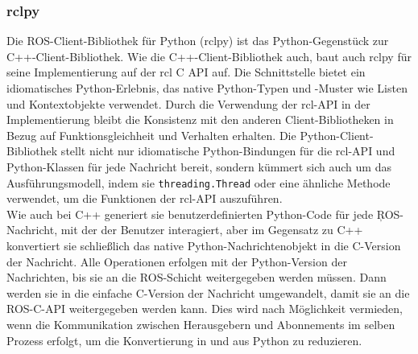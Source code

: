 \subsubsection{rclpy}\label{subsubsec:ROS2rclpy}
Die \ac{ROS}-Client-Bibliothek für Python (rclpy) ist das Python-Gegenstück zur C++-Client-Bibliothek. Wie die C++-Client-Bibliothek auch, baut auch rclpy für seine Implementierung auf der \ac{rcl} C \ac{API} auf. Die Schnittstelle bietet ein idiomatisches Python-Erlebnis, das native Python-Typen und -Muster wie Listen und Kontextobjekte verwendet. Durch die Verwendung der \ac{rcl}-\ac{API} in der Implementierung bleibt die Konsistenz mit den anderen Client-Bibliotheken in Bezug auf Funktionsgleichheit und Verhalten erhalten. Die Python-Client-Bibliothek stellt nicht nur idiomatische Python-Bindungen für die \ac{rcl}-\ac{API} und Python-Klassen für jede Nachricht bereit, sondern kümmert sich auch um das Ausführungsmodell, indem sie \texttt{threading.Thread} oder eine ähnliche Methode verwendet, um die Funktionen der \ac{rcl}-\ac{API} auszuführen.\\
Wie auch bei C++ generiert sie benutzerdefinierten Python-Code für jede \c{ROS}-Nachricht, mit der der Benutzer interagiert, aber im Gegensatz zu C++ konvertiert sie schließlich das native Python-Nachrichtenobjekt in die C-Version der Nachricht. Alle Operationen erfolgen mit der Python-Version der Nachrichten, bis sie an die \ac{ROS}-Schicht weitergegeben werden müssen. Dann werden sie in die einfache C-Version der Nachricht umgewandelt, damit sie an die \ac{ROS}-C-\ac{API} weitergegeben werden kann. Dies wird nach Möglichkeit vermieden, wenn die Kommunikation zwischen Herausgebern und Abonnements im selben Prozess erfolgt, um die Konvertierung in und aus Python zu reduzieren.\\

